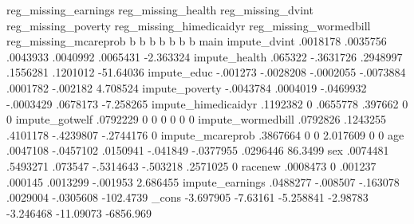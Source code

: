 	reg_missing_earnings	reg_missing_health	reg_missing_dvint	reg_missing_poverty	reg_missing_himedicaidyr	reg_missing_wormedbill	reg_missing_mcareprob
	b	b	b	b	b	b	b
main							
impute_dvint	.0018178	.0035756		.0043933	.0040992	.0065431	-2.363324
impute_health	.065322		-.3631726	.2948997	.1556281	.1201012	-51.64036
impute_educ	-.001273	-.0028208	-.0002055	-.0073884	.0001782	-.002182	4.708524
impute_poverty	-.0043784	.0004019	-.0469932		-.0003429	.0678173	-7.258265
impute_himedicaidyr	.1192382	0	.0655778	.397662		0	0
impute_gotwelf	.0792229	0	0	0	0	0	0
impute_wormedbill	.0792826	.1243255	.4101178	-.4239807	-.2744176		0
impute_mcareprob	.3867664	0	0	2.017609	0	0	
age	.0047108	-.0457102	.0150941	-.041849	-.0377955	.0296446	86.3499
sex	.0074481	.5493271	.073547	-.5314643	-.503218	.2571025	0
racenew	.0008473	0	.001237	.000145	.0013299	-.001953	2.686455
impute_earnings		.0488277	-.008507	-.163078	.0029004	-.0305608	-102.4739
_cons	-3.697905	-7.63161	-5.258841	-2.98783	-3.246468	-11.09073	-6856.969
